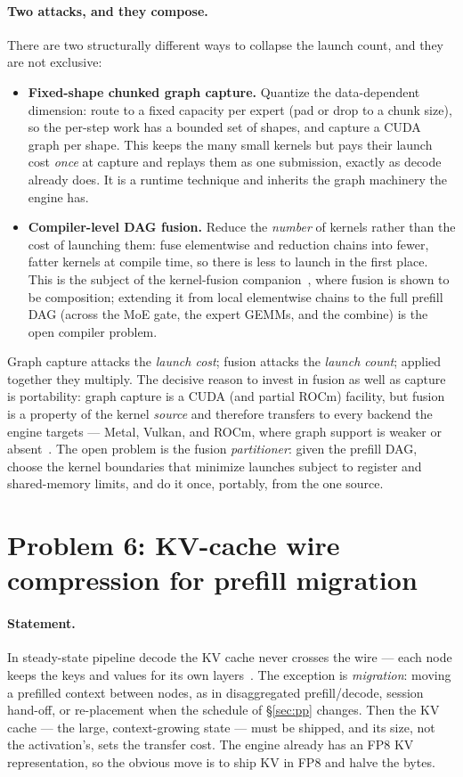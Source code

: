 \documentclass[11pt]{article}
\begin{document}
\paragraph{Two attacks, and they compose.} There are two structurally different ways to collapse the launch
count, and they are not exclusive:
\begin{itemize}[leftmargin=1.4em,itemsep=2pt]
\item \textbf{Fixed-shape chunked graph capture.} Quantize the data-dependent dimension: route to a fixed
capacity per expert (pad or drop to a chunk size), so the per-step work has a bounded set of shapes, and
capture a CUDA graph per shape. This keeps the many small kernels but pays their launch cost \emph{once}
at capture and replays them as one submission, exactly as decode already does. It is a runtime technique
and inherits the graph machinery the engine has.
\item \textbf{Compiler-level DAG fusion.} Reduce the \emph{number} of kernels rather than the cost of
launching them: fuse elementwise and reduction chains into fewer, fatter kernels at compile time, so there
is less to launch in the first place. This is the subject of the kernel-fusion companion~\cite{fuse},
where fusion is shown to be composition; extending it from local elementwise chains to the full prefill DAG
(across the MoE gate, the expert GEMMs, and the combine) is the open compiler problem.
\end{itemize}
Graph capture attacks the \emph{launch cost}; fusion attacks the \emph{launch count}; applied together they
multiply. The decisive reason to invest in fusion as well as capture is portability: graph capture is a
CUDA (and partial ROCm) facility, but fusion is a property of the kernel \emph{source} and therefore
transfers to every backend the engine targets --- Metal, Vulkan, and ROCm, where graph support is weaker or
absent~\cite{backend}. The open problem is the fusion \emph{partitioner}: given the prefill DAG, choose the
kernel boundaries that minimize launches subject to register and shared-memory limits, and do it once,
portably, from the one source.

\section{Problem 6: KV-cache wire compression for prefill migration}
\label{sec:kvcompress}

\paragraph{Statement.} In steady-state pipeline decode the KV cache never crosses the wire --- each node
keeps the keys and values for its own layers~\cite{latency}. The exception is \emph{migration}: moving a
prefilled context between nodes, as in disaggregated prefill/decode, session hand-off, or re-placement when
the schedule of \S\ref{sec:pp} changes. Then the KV cache --- the large, context-growing state --- must be
shipped, and its size, not the activation's, sets the transfer cost. The engine already has an FP8 KV
representation, so the obvious move is to ship KV in FP8 and halve the bytes.
\end{document}
